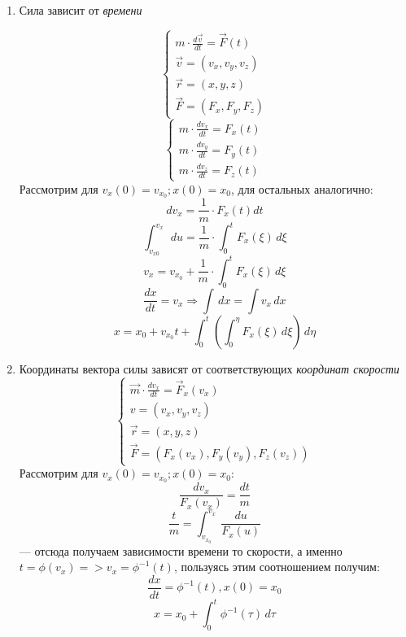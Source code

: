 \documentclass[12pt,a4paper]{report}
\begin{document}
\begin{enumerate}
    \item Сила зависит от \textit{времени}

          \[
              \begin{cases}
                  m \cdot \frac{d\vec v}{dt} = \vec F(t) \\
                  \vec v = (v_x, v_y, v_z)               \\
                  \vec r = (x,y,z)                       \\
                  \vec F = (F_x, F_y, F_z)
              \end{cases}
          \]
          \[
              \begin{cases}
                  m \cdot \frac{dv_x}{dt} = F_x(t) \\
                  m \cdot \frac{dv_y}{dt} = F_y(t) \\
                  m \cdot \frac{dv_z}{dt} = F_z(t)
              \end{cases}
          \]
          Рассмотрим для $v_x(0) = v_{x_0} ; x(0) = x_0 $, для остальных аналогично:
          \[ dv_x = \frac{1}{m} \cdot F_x(t) dt\]
          \[\int_{v_{x0}}^{v_x} \,du = \frac{1}{m} \cdot \int_{0}^{t} F_x(\xi) \,d\xi \]
          \[v_x = v_{x_0} + \frac{1}{m} \cdot \int_{0}^{t} F_x(\xi) \,d\xi\]
          \[\frac{dx}{dt} = v_x \Rightarrow \int \,dx = \int v_x \,dx \]
          \[x = x_0 + v_{x_0}t + \int_{0}^{t}  (\int_{0}^{\eta} F_x(\xi) \,d\xi) \,d\eta \]
    \item Координаты вектора силы зависят от соответствующих \textit{координат скорости}
          \[
              \begin{cases}
                  \vec m \cdot \frac{dv_x}{dt} = \vec F_x(v_x) \\
                  v = (v_x, v_y, v_z)                          \\
                  \vec r = (x,y,z)                             \\
                  \vec F = (F_x(v_x), F_y(v_y), F_z(v_z))
              \end{cases}
          \]
          Рассмотрим для $v_x(0) = v_{x_0} ; x(0) = x_0$:
          \[\frac{dv_x}{F_x(v_x)} = \frac{dt}{m}\]
          \[\frac{t}{m} = \int_{v_{x_0}}^{v_x} \frac{du}{F_x(u)}\] --- отсюда получаем зависимости времени то скорости, а именно $t = \phi(v_x) => v_x = \phi^{-1}(t)$, пользуясь этим соотношением получим:
          \[\frac{dx}{dt} = \phi^{-1}(t), x(0) = x_0\]
          \[x = x_0 + \int_{0}^{t} \phi^{-1}(\tau) \,d\tau \]

\end{enumerate}
\end{document}
